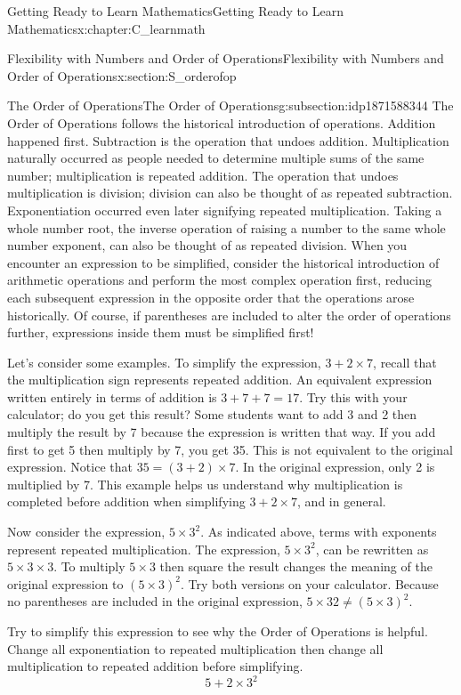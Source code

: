 \documentclass[oneside,10pt,]{book}
\numberwithin{equation}{chapter}
\begin{document}
\begin{chapterptx}{Getting Ready to Learn Mathematics}{}{Getting Ready to Learn Mathematics}{}{}{x:chapter:C_learnmath}
\begin{sectionptx}{Flexibility with Numbers and Order of Operations}{}{Flexibility with Numbers and Order of Operations}{}{}{x:section:S_orderofop}
\begin{subsectionptx}{The Order of Operations}{}{The Order of Operations}{}{}{g:subsection:idp1871588344}
The Order of Operations follows the historical introduction of operations. Addition happened first. Subtraction is the operation that undoes addition. Multiplication naturally occurred as people needed to determine multiple sums of the same number; multiplication is repeated addition. The operation that undoes multiplication is division; division can also be thought of as repeated subtraction. Exponentiation occurred even later signifying repeated multiplication. Taking a whole number root, the inverse operation of raising a number to the same whole number exponent, can also be thought of as repeated division. When you encounter an expression to be simplified, consider the historical introduction of arithmetic operations and perform the most complex operation first, reducing each subsequent expression in the opposite order that the operations arose historically. Of course, if parentheses are included to alter the order of operations further, expressions inside them must be simplified first!%
\par
Let's consider some examples. To simplify the expression, \(3 + 2 \times 7\), recall that the multiplication sign represents repeated addition. An equivalent expression written entirely in terms of addition is \(3 + 7 + 7 = 17\). Try this with your calculator; do you get this result? Some students want to add 3 and 2 then multiply the result by 7 because the expression is written that way. If you add first to get 5 then multiply by 7, you get 35. This is not equivalent to the original expression. Notice that \(35 = (3 + 2) \times 7\). In the original expression, only 2 is multiplied by 7. This example helps us understand why multiplication is completed before addition when simplifying \(3 + 2 \times 7\), and in general.%
\par
Now consider the expression, \(5 \times 3^2\). As indicated above, terms with exponents represent repeated multiplication. The expression, \(5 \times 3^2\), can be rewritten as \(5 \times 3 \times 3\). To multiply \(5 \times 3\) then square the result changes the meaning of the original expression to \((5 \times 3)^2\). Try both versions on your calculator. Because no parentheses are included in the original expression, \(5 \times 32 \ne (5 \times 3)^2\).%
\par
Try to simplify this expression to see why the Order of Operations is helpful. Change all exponentiation to repeated multiplication then change all multiplication to repeated addition before simplifying.%
\begin{equation*}
5 + 2 \times 3^2

\end{equation*}
\end{subsectionptx}
\end{sectionptx}
\end{chapterptx}
\end{document}
